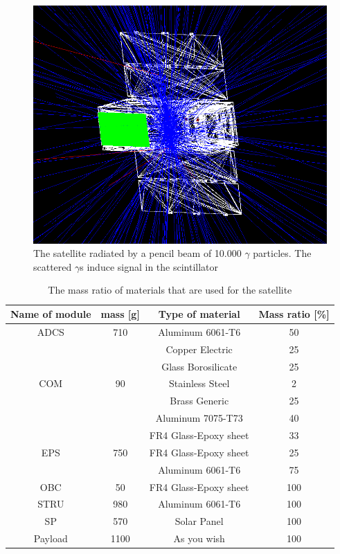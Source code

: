 \documentclass[12pt, a4paper,titlepage]{article}
\numberwithin{equation}{section}
\numberwithin{figure}{section}
\begin{document}
\begin{figure}
\includegraphics[width=150.0mm]{images/satellite_rad.png}
\caption{The satellite radiated by a pencil beam of 10.000 $\gamma$ particles. The scattered $\gamma$s induce signal in the scintillator}
\end{figure}

\begin{table}
\begin{center}
\begin{tabular}{ |c|c|c|c|} 
 \hline
 Name of module & mass [g] & Type of material & Mass ratio [\%]\\\hline
 ADCS &	710	& Aluminum 6061-T6 &	50\\
			& & Copper Electric	& 25 \\
			& &  Glass Borosilicate 	& 25\\\hline
COM	& 	90	& 	Stainless Steel 	& 2\\
			& 	& Brass Generic		& 25\\
			& 	& Aluminum 7075-T73		& 40\\
			& 	& FR4 Glass-Epoxy sheet	& 	33\\\hline
EPS	& 	750	& 	FR4 Glass-Epoxy sheet		& 25\\
			& 	& Aluminum 6061-T6		& 75\\\hline
OBC	&	50		& FR4 Glass-Epoxy sheet	& 	100\\\hline
STRU	& 	980		& Aluminum 6061-T6	& 	100\\\hline
SP	& 	570		& Solar Panel	& 	100\\\hline
Payload	& 	1100	& 	As you wish	& 	100\\
 \hline
\end{tabular}
\end{center}
\caption{The mass ratio of materials that are used for the satellite}
\end{table}
\end{document}
